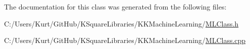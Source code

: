 The documentation for this class was generated from the following files\+:\begin{DoxyCompactItemize}
\item 
C\+:/\+Users/\+Kurt/\+Git\+Hub/\+K\+Square\+Libraries/\+K\+K\+Machine\+Learning/\hyperlink{_m_l_class_8h}{M\+L\+Class.\+h}\item 
C\+:/\+Users/\+Kurt/\+Git\+Hub/\+K\+Square\+Libraries/\+K\+K\+Machine\+Learning/\hyperlink{_m_l_class_8cpp}{M\+L\+Class.\+cpp}\end{DoxyCompactItemize}
